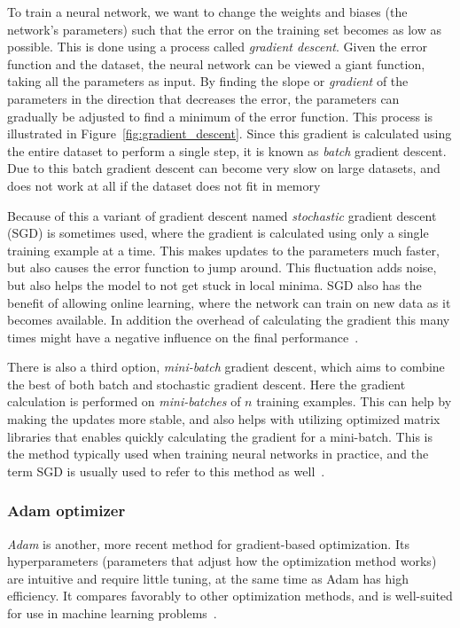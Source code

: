 \documentclass{kththesis}
\begin{document}
To train a neural network, we want to change the weights and biases (the network's parameters) such that the error on the training set becomes as low as possible. This is done using a process called \textit{gradient descent}. Given the error function and the dataset, the neural network can be viewed a giant function, taking all the parameters as input. By finding the slope or \textit{gradient} of the parameters in the direction that decreases the error, the parameters can gradually be adjusted to find a minimum of the error function. This process is illustrated in Figure~\ref{fig:gradient_descent}. Since this gradient is calculated using the entire dataset to perform a single step, it is known as \textit{batch} gradient descent. Due to this batch gradient descent can become very slow on large datasets, and does not work at all if the dataset does not fit in memory~\cite{gradient_descent}

Because of this a variant of gradient descent named \textit{stochastic} gradient descent (SGD) is sometimes used, where the gradient is calculated using only a single training example at a time. This makes updates to the parameters much faster, but also causes the error function to jump around. This fluctuation adds noise, but also helps the model to not get stuck in local minima. SGD also has the benefit of allowing online learning, where the network can train on new data as it becomes available. In addition the overhead of calculating the gradient this many times might have a negative influence on the final performance~\cite{gradient_descent}.

There is also a third option, \textit{mini-batch} gradient descent, which aims to combine the best of both batch and stochastic gradient descent. Here the gradient calculation is performed on \textit{mini-batches} of $n$ training examples. This can help by making the updates more stable, and also helps with utilizing optimized matrix libraries that enables quickly calculating the gradient for a mini-batch. This is the method typically used when training neural networks in practice, and the term SGD is usually used to refer to this method as well~\cite{gradient_descent}.

\subsubsection{Adam optimizer}
\textit{Adam} is another, more recent method for gradient-based optimization. Its hyperparameters (parameters that adjust how the optimization method works) are intuitive and require little tuning, at the same time as Adam has high efficiency. It compares favorably to other optimization methods, and is well-suited for use in  machine learning problems~\cite{adam}.
\end{document}
